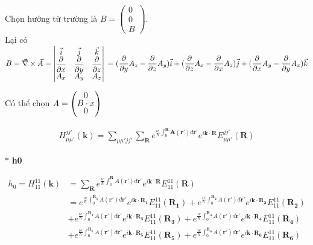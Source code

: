 \documentclass{report}
\begin{document}
Chọn hướng từ trường là $\renewcommand{\arraystretch}{0.7} B = \begin{pmatrix} 0  \\ 0  \\ B  \end{pmatrix}$. \\
\noindent Lại có $B = \vec{\nabla} \times \vec{A} =
	\begin{vmatrix}
		\vec{i}                      & \vec{j}                      & \vec{k}                      \\
		\dfrac{\partial}{\partial x} & \dfrac{\partial}{\partial y} & \dfrac{\partial}{\partial z} \\ A_x & A_y & A_z
	\end{vmatrix}\\
	= (\dfrac{\partial}{\partial y}A_z - \dfrac{\partial}{\partial z}A_y)\vec{i} + (\dfrac{\partial}{\partial z}A_x - \dfrac{\partial}{\partial x}A_z)\vec{j} + (\dfrac{\partial}{\partial x}A_y - \dfrac{\partial}{\partial y}A_x)\vec{k}$

\noindent Có thể chọn $A = \renewcommand{\arraystretch}{0.7} \begin{pmatrix} 0  \\ B\cdot x  \\ 0  \end{pmatrix}$

\begin{align*}
	H_{\mu \mu'}^{jj'}(\textbf{k}) = \sum_{\mu\mu' jj'} \sum_{\textbf{R}} e^{\frac{ie}{\hbar}\int_{0}^{\textbf{R}} \textbf{A}(\mathbf{r'})d\mathbf{r'} } e^{i \mathbf{k}\cdot\textbf{R}} E_{\mu\mu'}^{jj'}(\textbf{R})
\end{align*}

\noindent $\ast$ \textbf{h0}

\begin{align*}
	h_0 = H_{11}^{11}(\textbf{k}) & = \sum_{\textbf{R}} e^{\frac{ie}{\hbar}\int_{0}^{\mathbf{R}}A(\mathbf{r'})d\mathbf{r'}}e^{i\mathbf{k\cdot R}} E_{11}^{11}(\mathbf{R})                                                                                                               \\
	                              & = e^{\frac{ie}{\hbar}\int_{0}^{\mathbf{R_1}}A(\mathbf{r'})d\mathbf{r'}}e^{i\mathbf{k\cdot R_1}} E_{11}^{11}(\mathbf{R_1}) + e^{\frac{ie}{\hbar}\int_{0}^{\mathbf{R_2}}A(\mathbf{r'})d\mathbf{r'}}e^{i\mathbf{k\cdot R_2}} E_{11}^{11}(\mathbf{R_2}) \\
	                              & + e^{\frac{ie}{\hbar}\int_{0}^{\mathbf{R_3}}A(\mathbf{r'})d\mathbf{r'}}e^{i\mathbf{k\cdot R_3}} E_{11}^{11}(\mathbf{R_3}) + e^{\frac{ie}{\hbar}\int_{0}^{\mathbf{R_4}}A(\mathbf{r'})d\mathbf{r'}}e^{i\mathbf{k\cdot R_4}} E_{11}^{11}(\mathbf{R_4}) \\
	                              & + e^{\frac{ie}{\hbar}\int_{0}^{\mathbf{R_5}}A(\mathbf{r'})d\mathbf{r'}}e^{i\mathbf{k\cdot R_5}} E_{11}^{11}(\mathbf{R_5}) + e^{\frac{ie}{\hbar}\int_{0}^{\mathbf{R_6}}A(\mathbf{r'})d\mathbf{r'}}e^{i\mathbf{k\cdot R_6}} E_{11}^{11}(\mathbf{R_6})
\end{align*}
\end{document}
